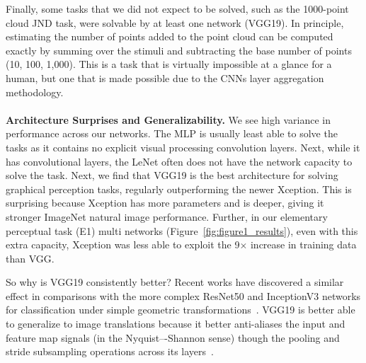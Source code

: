 {Finally, some tasks that we did not expect to be solved, such as the 1000-point cloud JND task, were solvable by at least one network (VGG19). In principle, estimating the number of points added to the point cloud can be computed exactly by summing over the stimuli and subtracting the base number of points (10, 100, 1,000). This is a task that is virtually impossible at a glance for a human, but one that is made possible due to the CNNs layer aggregation methodology.
%
%
%
%
\\~\\
\noindent \textbf{Architecture Surprises and Generalizability.} We see high variance in performance across our networks. The MLP is usually least able to solve the tasks as it contains no explicit visual processing convolution layers. Next, while it has convolutional layers, the LeNet often does not have the network capacity to solve the task. Next, we find that VGG19 is the best architecture for solving graphical perception tasks, regularly outperforming the newer Xception. This is surprising because Xception has more parameters and is deeper, giving it stronger ImageNet natural image performance. Further, in our elementary perceptual task (E1) multi networks (Figure~\ref{fig:figure1_results}), even with this extra capacity, Xception was less able to exploit the 9$\times$ increase in training data than VGG.

So why is VGG19 consistently better? Recent works have discovered a similar effect in comparisons with the more complex ResNet50 and InceptionV3 networks for classification under simple geometric transformations~\cite{Engstrom2017}. VGG19 is better able to generalize to image translations because it better anti-aliases the input and feature map signals (in the Nyquist–-Shannon sense) though the pooling and stride subsampling operations across its layers~\cite{Azulay2018}. %

}
